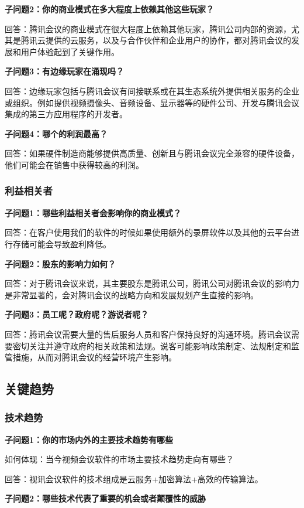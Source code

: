 \documentclass[a4paper,12pt]{article}
\begin{document}
    \textbf{子问题2：你的商业模式在多大程度上依赖其他这些玩家？}

    回答：腾讯会议的商业模式在很大程度上依赖其他玩家，腾讯公司内部的资源，尤其是腾讯云提供的云服务，以及与合作伙伴和企业用户的协作，都对腾讯会议的发展和用户体验起到了关键作用。

    \textbf{子问题3：有边缘玩家在涌现吗？}

    回答：边缘玩家包括与腾讯会议有间接联系或在其生态系统外提供相关服务的企业或组织。例如提供视频摄像头、音频设备、显示器等的硬件公司、开发与腾讯会议集成的第三方应用程序的开发者。

    \textbf{子问题4：哪个的利润最高？}

    回答：如果硬件制造商能够提供高质量、创新且与腾讯会议完全兼容的硬件设备，他们可能会在销售中获得较高的利润。
    
    \subsubsection{利益相关者}
    \textbf{子问题1：哪些利益相关者会影响你的商业模式？}
    
    回答：在客户使用我们的软件的时候如果使用额外的录屏软件以及其他的云平台进行存储可能会导致盈利降低。

    \textbf{子问题2：股东的影响力如何？}

    回答：对于腾讯会议来说，其主要股东是腾讯公司，腾讯公司对腾讯会议的影响力是非常显著的，会对腾讯会议的战略方向和发展规划产生直接的影响。

    \textbf{子问题3：员工呢？政府呢？游说者呢？}

    回答：腾讯会议需要大量的售后服务人员和客户保持良好的沟通环境。腾讯会议需要密切关注并遵守政府的相关政策和法规。说客可能影响政策制定、法规制定和监管措施，从而对腾讯会议的经营环境产生影响。
    
    \subsection{关键趋势}
    \subsubsection{技术趋势}
    \textbf{子问题1：你的市场内外的主要技术趋势有哪些}

    如何体现：当今视频会议软件的市场主要技术趋势走向有哪些？

    回答：视讯会议软件的技术组成是云服务+加密算法+高效的传输算法。

    \textbf{子问题2：哪些技术代表了重要的机会或者颠覆性的威胁}
\end{document}
